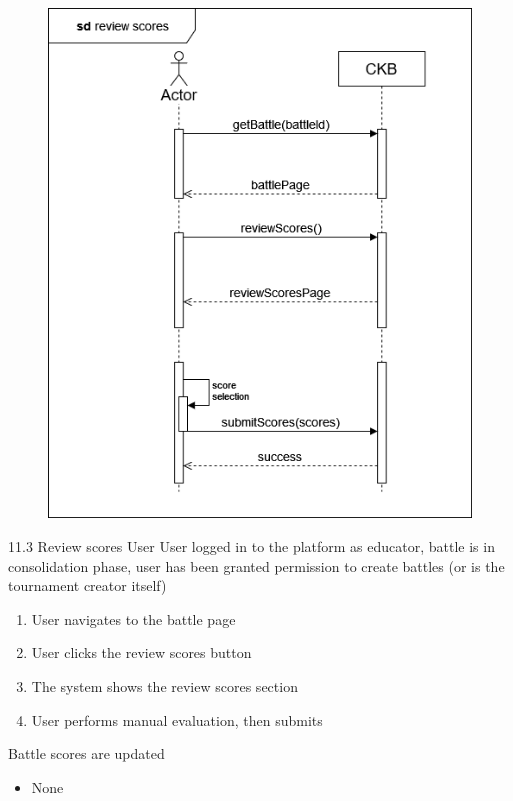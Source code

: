 \usecase
{
    \begin{figure}[H]
        \centering
        \includegraphics[width=\textwidth]{src/sequence_diagrams/revscores.png}
    \end{figure}
}
{11.3}
{Review scores} %
{User} %
{User logged in to the platform as educator, battle is in consolidation phase, user has been granted permission to create battles (or is the tournament creator itself)} %
{ %
    \begin{enumerate}
        \item User navigates to the battle page
        \item User clicks the review scores button
        \item The system shows the review scores section
        \item User performs manual evaluation, then submits
    \end{enumerate}
}
{Battle scores are updated} %
{ %
    \begin{itemize}
        \item None
    \end{itemize}
}
{ %

}

